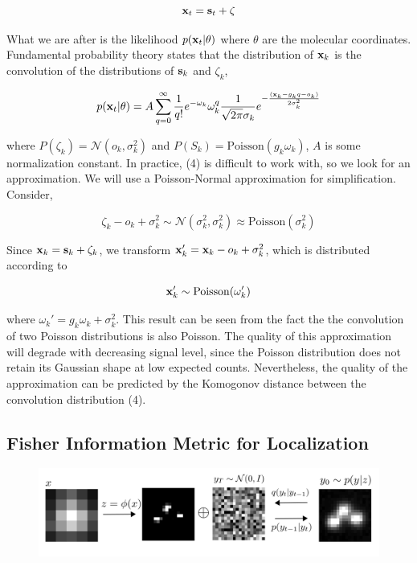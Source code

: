 \documentclass{article}
\begin{document}
\begin{equation}
\bold{x}_t = \bold{s}_t + \bold{\zeta}
\end{equation}

What we are after is the likelihood $p(\bold{x}_{t}|\theta)$ where $\theta$ are the molecular coordinates. Fundamental probability theory states that the distribution of $\bold{x}_{k}$ is the convolution of the distributions of $\bold{s}_{k}$ and $\zeta_{k}$,

\begin{equation}
p(\bold{x}_{t}|\theta) = A\sum_{q=0}^{\infty} \frac{1}{q!}e^{-\omega_{k}}\omega_{k}^{q}\frac{1}{\sqrt{2\pi}\sigma_{k}}e^{-\frac{(\bold{x}_{k}-g_{k}q-o_{k})}{2\sigma_{k}^{2}}}
\end{equation}

where $P(\zeta_{k}) = \mathcal{N}(o_{k},\sigma_{k}^{2})$ and $P(S_{k}) = \mathrm{Poisson}(g_{k}\omega_{k})$,  $A$ is some normalization constant. In practice, (4) is difficult to work with, so we look for an approximation. We will use a Poisson-Normal approximation for simplification. Consider,

\begin{equation}
\zeta_{k} - o_{k} + \sigma_{k}^{2} \sim \mathcal{N}(\sigma_{k}^{2},\sigma_{k}^{2}) \approx \mathrm{Poisson}(\sigma_{k}^{2})
\end{equation}

Since $\bold{x}_{k} = \bold{s}_{k} + \zeta_{k}$, we transform $\bold{x}_{k}' = \bold{x}_{k} - o_{k} + \sigma_{k}^{2}$, which is distributed according to 

\begin{equation}
\bold{x}_{k}' \sim \mathrm{Poisson}(\omega_{k}')
\end{equation}

where $\omega_{k}' = g_{k}\omega_{k} + \sigma_{k}^{2}$. This result can be seen from the fact the the convolution of two Poisson distributions is also Poisson. The quality of this approximation will degrade with decreasing signal level, since the Poisson distribution does not retain its Gaussian shape at low expected counts. Nevertheless, the quality of the approximation can be predicted by the Komogonov distance between the convolution distribution (4).

\subsection{Fisher Information Metric for Localization}

\begin{figure}
\includegraphics[scale=4.0]{Denoise.png}
\end{figure}
\end{document}
